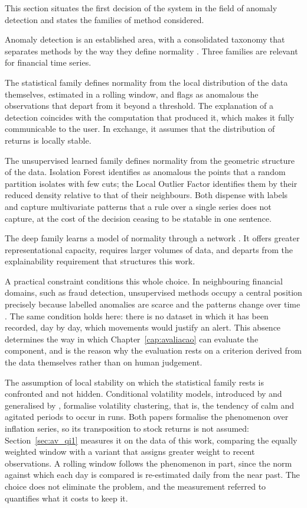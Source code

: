 This section situates the first decision of the system in the field of anomaly detection and states
the families of method considered.

Anomaly detection is an established area, with a consolidated taxonomy that separates methods by
the way they define normality \autocite{chandola2009anomaly, pang2021deep}. Three families are
relevant for financial time series.

The statistical family defines normality from the local distribution of the data themselves,
estimated in a rolling window, and flags as anomalous the observations that depart from it beyond a
threshold. The explanation of a detection coincides with the computation that produced it, which
makes it fully communicable to the user. In exchange, it assumes that the distribution of returns
is locally stable.

The unsupervised learned family defines normality from the geometric structure of the data.
Isolation Forest \autocite{liu2008isolation} identifies as anomalous the points that a random
partition isolates with few cuts; the Local Outlier Factor \autocite{breunig2000lof} identifies
them by their reduced density relative to that of their neighbours. Both dispense with labels and
capture multivariate patterns that a rule over a single series does not capture, at the cost of the
decision ceasing to be statable in one sentence.

The deep family learns a model of normality through a network \autocite{pang2021deep}. It offers
greater representational capacity, requires larger volumes of data, and departs from the
explainability requirement that structures this work.

A practical constraint conditions this whole choice. In neighbouring financial domains, such as
fraud detection, unsupervised methods occupy a central position precisely because labelled
anomalies are scarce and the patterns change over time \autocite{ahmed2016financial}. The same
condition holds here: there is no dataset in which it has been recorded, day by day, which
movements would justify an alert. This absence determines the way in which
Chapter~\ref{cap:avaliacao} can evaluate the component, and is the reason why the evaluation rests
on a criterion derived from the data themselves rather than on human judgement.

The assumption of local stability on which the statistical family rests is confronted and not
hidden. Conditional volatility models, introduced by \textcite{engle1982arch} and generalised by
\textcite{bollerslev1986garch}, formalise volatility clustering, that is, the tendency of calm and
agitated periods to occur in runs. Both papers formalise the phenomenon over inflation series, so
its transposition to stock returns is not assumed: Section~\ref{sec:av_qi1} measures it on the data
of this work, comparing the equally weighted window with a variant that assigns greater weight to
recent observations. A rolling window follows the phenomenon in part, since the norm against which
each day is compared is re-estimated daily from the near past. The choice does not eliminate the
problem, and the measurement referred to quantifies what it costs to keep it.

